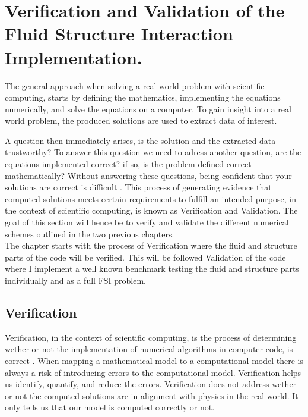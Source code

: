 \chapter{Verification and Validation of the Fluid Structure Interaction Implementation.}\label{chap:VV}
The general approach when solving a real world problem with scientific computing, starts by defining the mathematics, implementing the equations numerically, and solve the equations on a computer. To gain insight into a real world problem, the produced solutions are used to extract data of interest.

A question then immediately arises, is the solution and the extracted data trustworthy?
To answer this question we need to adress another question, are the equations implemented correct? if so, is the problem defined correct mathematically?
Without answering these questions, being confident that your solutions are correct is difficult \cite{oberkampf2008verification}. This process of generating evidence that computed solutions meets certain requirements to fulfill an intended purpose, in the context of scientific computing, is known as Verification and Validation. The goal of this section will hence be to verify and validate the different numerical schemes outlined in the two previous chapters.  \\

The chapter starts with the process of Verification where the fluid and structure parts of the code will be verified. This will be followed Validation of the code where I implement a well known benchmark testing the fluid and structure parts individually and as a full FSI problem. \newline

\section{Verification}
Verification, in the context of scientific computing, is the process of determining wether or not the implementation of numerical algorithms in computer code, is correct \cite{Oberkampf2010}.
When mapping a mathematical model to a computational model there is always a risk of introducing errors to the computational model. Verification helps us identify, quantify, and reduce the errors. Verification does not address wether or not the computed solutions are in alignment with physics in the real world. It only tells us that our model is computed correctly or not. \newline

